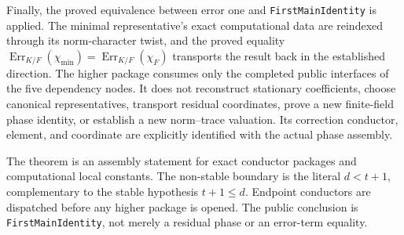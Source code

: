 \begin{theorem}
Finally, the proved equivalence between error one and
\texttt{FirstMainIdentity} is applied.  The minimal representative's exact
computational data are reindexed through its norm-character twist, and the
proved equality
\(\operatorname{Err}_{K/F}(\chi_{\min})=
  \operatorname{Err}_{K/F}(\chi_F)\)
transports the result back in the established direction.
\leanok
{}
\FormalizationContract
The higher package consumes only the completed public interfaces of the five
dependency nodes.  It does not reconstruct stationary coefficients, choose
canonical representatives, transport residual coordinates, prove a new
finite-field phase identity, or establish a new norm--trace valuation.  Its
correction conductor, element, and coordinate are explicitly identified
with the actual phase assembly.

The theorem is an assembly statement for exact conductor packages and
computational local constants.  The non-stable boundary is the literal
\(d<t+1\), complementary to the stable hypothesis \(t+1\le d\).  Endpoint
conductors are dispatched before any higher package is opened.  The public
conclusion is \texttt{FirstMainIdentity}, not merely a residual phase or an
error-term equality.
\end{theorem}
